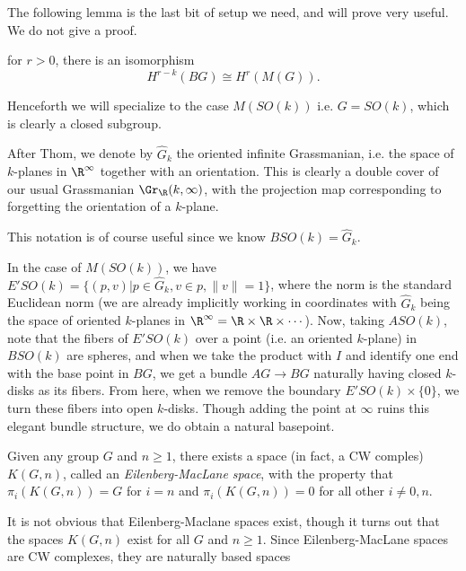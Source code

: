 The following lemma is the last bit of setup we need, and will prove very useful. We do not give a proof.

\begin{lemma}
    for $r>0$, there is an isomorphism
    \[H^{r-k}(BG)\cong H^r(M(G)).\]
\end{lemma}

Henceforth we will specialize to the case $M(SO(k))$ i.e. $G=SO(k)$, which is clearly a closed subgroup.

\begin{notation}
    After Thom, we denote by $\widehat G_k$ the oriented infinite Grassmanian, i.e. the space of $k$-planes in $\R^\infty$ together with an orientation. This is clearly a double cover of our usual Grassmanian $\Gr_\R(k,\infty)$, with the projection map corresponding to forgetting the orientation of a $k$-plane.
\end{notation}
This notation is of course useful since we know $BSO(k)=\widehat G_k$.

In the case of $M(SO(k))$, we have $E'SO(k)=\{(p,v)|p\in \widehat G_k, v\in p, \|v\|=1\}$, where the norm is the standard Euclidean norm (we are already implicitly working in coordinates with $\widehat G_k$ being the space of oriented $k$-planes in $\R^\infty=\R\times\R\times\cdots$). Now, taking $ASO(k)$, note that the fibers of $E'SO(k)$ over a point (i.e. an oriented $k$-plane) in $BSO(k)$ are spheres, and when we take the product with $I$ and identify one end with the base point in $BG$, we get a bundle $AG\to BG$ naturally having closed $k$-disks as its fibers. From here, when we remove the boundary $E'SO(k)\times \{0\}$, we turn these fibers into open $k$-disks. Though adding the point at $\infty$ ruins this elegant bundle structure, we do obtain a natural basepoint.

\begin{definition}
    Given any group $G$ and $n\geq 1$, there exists a space (in fact, a CW comples) $K(G,n)$, called an \textit{Eilenberg-MacLane space}, with the property that $\pi_i(K(G,n))=G$ for $i=n$ and $\pi_i(K(G,n))=0$ for all other $i\neq 0,n$.
\end{definition}

It is not obvious that Eilenberg-Maclane spaces exist, though it turns out that the spaces $K(G,n)$ exist for all $G$ and $n\geq 1$. Since Eilenberg-MacLane spaces are CW complexes, they are naturally based spaces 




